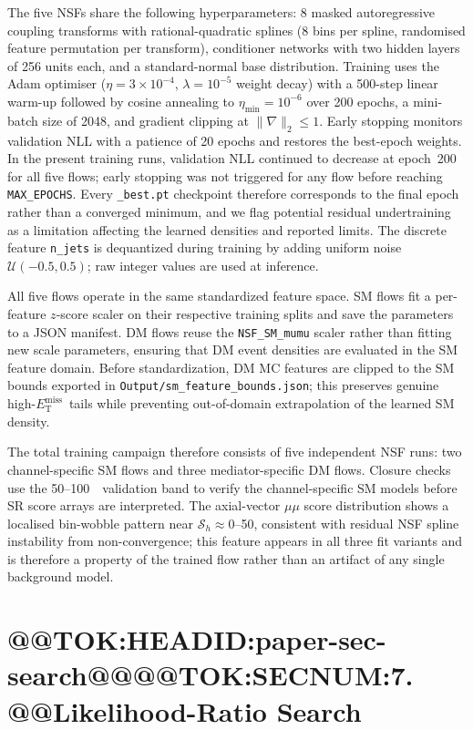 \documentclass[11pt]{article}
\newcommand{\GeV}{\text{GeV}}
\newcommand{\MET}{\ensuremath{E_{\mathrm{T}}^{\mathrm{miss}}}}
\begin{document}
The five NSFs share the following hyperparameters: 8 masked autoregressive coupling
transforms with rational-quadratic splines (8 bins per spline, randomised feature
permutation per transform), conditioner networks with two hidden layers of 256 units each,
and a standard-normal base distribution.
Training uses the Adam optimiser ($\eta=3\times10^{-4}$, $\lambda=10^{-5}$ weight decay)
with a 500-step linear warm-up followed by cosine annealing to
$\eta_\mathrm{min}=10^{-6}$ over 200 epochs, a mini-batch size of 2048, and gradient
clipping at $\|\nabla\|_2\le 1$.
Early stopping monitors validation NLL with a patience of 20 epochs and restores the
best-epoch weights.
In the present training runs, validation NLL continued to decrease at
epoch~200 for all five flows; early stopping was not triggered for any
flow before reaching \texttt{MAX\_EPOCHS}. Every \texttt{\_best.pt}
checkpoint therefore corresponds to the final epoch rather than a
converged minimum, and we flag potential residual undertraining as a
limitation affecting the learned densities and reported limits.
The discrete feature \texttt{n\_jets} is dequantized during training by adding uniform
noise $\mathcal{U}(-0.5,0.5)$; raw integer values are used at inference.

All five flows operate in the same standardized feature space.
SM flows fit a per-feature $z$-score scaler on their respective training splits and save
the parameters to a JSON manifest.
DM flows reuse the \texttt{NSF\_SM\_mumu} scaler rather than fitting new scale parameters,
ensuring that DM event densities are evaluated in the SM feature domain.
Before standardization, DM MC features are clipped to the SM bounds exported in
\texttt{Output/sm\_feature\_bounds.json}; this preserves genuine high-\MET\ tails while
preventing out-of-domain extrapolation of the learned SM density.

The total training campaign therefore consists of five independent NSF runs: two
channel-specific SM flows and three mediator-specific DM flows.
Closure checks use the 50--100~\GeV\ validation band to verify the channel-specific SM
models before SR score arrays are interpreted.
The axial-vector $\mu\mu$ score distribution shows a localised bin-wobble
pattern near $\mathcal{S}_h\approx0$--50, consistent with residual NSF
spline instability from non-convergence; this feature appears in all three
fit variants and is therefore a property of the trained flow rather than an
artifact of any single background model.

\section{@@TOK:HEADID:paper-sec-search@@@@TOK:SECNUM:7. @@Likelihood-Ratio Search}
\end{document}
